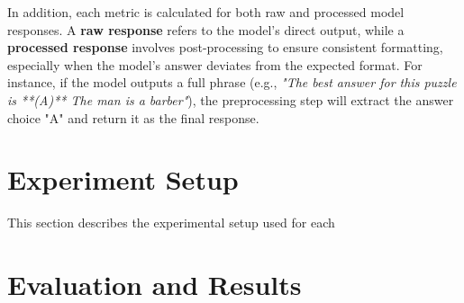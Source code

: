 In addition, each metric is calculated for both raw and processed model responses. A \textbf{raw response} refers to the model's direct output, while a \textbf{processed response} involves post-processing to ensure consistent formatting, especially when the model's answer deviates from the expected format. For instance, if the model outputs a full phrase (e.g., \textit{"The best answer for this puzzle is **(A)** The man is a barber"}), the preprocessing step will extract the answer choice "A" and return it as the final response.

\section{Experiment Setup}

This section describes the experimental setup used for each

\section{Evaluation and Results}

